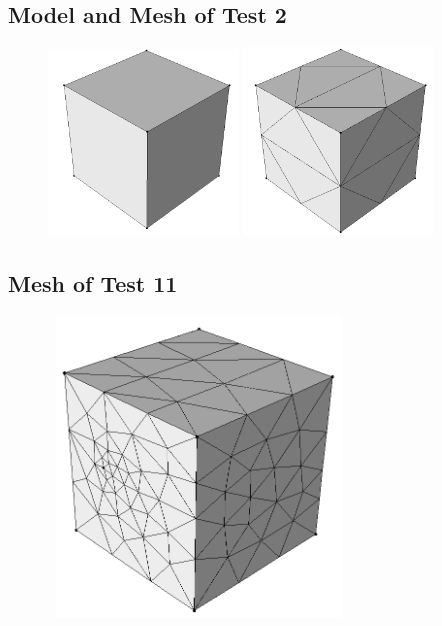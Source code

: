 \documentclass[a4paper, 12pt]{article}
\begin{document}
\subsection{Model and Mesh of Test 2} \label{subsec:test2Img}
\begin{figure}[H]
  \centering
  \subfigure
    { \includegraphics[width=0.45\textwidth, height=0.45\textwidth]
      {test2_smd}}
  \subfigure
    { \includegraphics[width=0.45\textwidth, height=0.45\textwidth]
      {test2_sms}}
\end{figure}

\subsection{Mesh of Test 11} \label{subsec:test11Img}
\begin{figure}[H]
  \centering
  \includegraphics[width=8cm, height=8cm]{test11_sms}
\end{figure}
\end{document}
